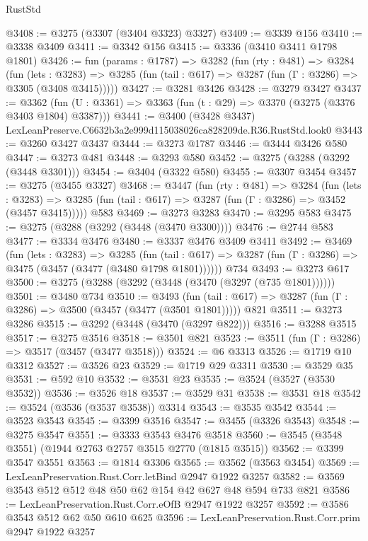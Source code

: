 \begin{lexlean}{RustStd}
\begin{coremodule}
@3408 := @3275 (@3307 (@3404 @3323) @3327)
@3409 := @3339 @156
@3410 := @3338 @3409
@3411 := @3342 @156
@3415 := @3336 (@3410 @3411 @1798 @1801)
@3426 := fun (params : @1787) =>
  @3282
    (fun (rty : @481) =>
    @3284
      (fun (lets : @3283) =>
      @3285 (fun (tail : @617) => @3287 (fun (Γ : @3286) => @3305 (@3408 @3415)))))
@3427 := @3281 @3426
@3428 := @3279 @3427
@3437 := @3362 (fun (U : @3361) => @3363 (fun (t : @29) => @3370 (@3275 (@3376 @3403 @1804) @3387)))
@3441 := @3400 (@3428 @3437) LexLeanPreserve.C6632b3a2e999d115038026ca828209de.R36.RustStd.look0
@3443 := @3260 @3427 @3437
@3444 := @3273 @1787
@3446 := @3444 @3426 @580
@3447 := @3273 @481
@3448 := @3293 @580
@3452 := @3275 (@3288 (@3292 (@3448 @3301)))
@3454 := @3404 (@3322 @580)
@3455 := @3307 @3454
@3457 := @3275 (@3455 @3327)
@3468 := @3447
    (fun (rty : @481) =>
    @3284
      (fun (lets : @3283) =>
      @3285 (fun (tail : @617) => @3287 (fun (Γ : @3286) => @3452 (@3457 @3415)))))
    @583
@3469 := @3273 @3283
@3470 := @3295 @583
@3475 := @3275 (@3288 (@3292 (@3448 (@3470 @3300))))
@3476 := @2744 @583
@3477 := @3334 @3476
@3480 := @3337 @3476 @3409 @3411
@3492 := @3469
    (fun (lets : @3283) =>
    @3285
      (fun (tail : @617) => @3287 (fun (Γ : @3286) => @3475 (@3457 (@3477 (@3480 @1798 @1801))))))
    @734
@3493 := @3273 @617
@3500 := @3275 (@3288 (@3292 (@3448 (@3470 (@3297 (@735 @1801))))))
@3501 := @3480 @734
@3510 := @3493
    (fun (tail : @617) => @3287 (fun (Γ : @3286) => @3500 (@3457 (@3477 (@3501 @1801)))))
    @821
@3511 := @3273 @3286
@3515 := @3292 (@3448 (@3470 (@3297 @822)))
@3516 := @3288 @3515
@3517 := @3275 @3516
@3518 := @3501 @821
@3523 := @3511 (fun (Γ : @3286) => @3517 (@3457 (@3477 @3518)))
@3524 := @6 @3313
@3526 := @1719 @10 @3312
@3527 := @3526 @23
@3529 := @1719 @29 @3311
@3530 := @3529 @35
@3531 := @592 @10
@3532 := @3531 @23
@3535 := @3524 (@3527 (@3530 @3532))
@3536 := @3526 @18
@3537 := @3529 @31
@3538 := @3531 @18
@3542 := @3524 (@3536 (@3537 @3538)) @3314
@3543 := @3535 @3542
@3544 := @3523 @3543
@3545 := @3399 @3516
@3547 := @3455 (@3326 @3543)
@3548 := @3275 @3547
@3551 := @3333 @3543 @3476 @3518
@3560 := @3545 (@3548 @3551) (@1944 @2763 @2757 @3515 @2770 (@1815 @3515))
@3562 := @3399 @3547 @3551
@3563 := @1814 @3306
@3565 := @3562 (@3563 @3454)
@3569 := LexLeanPreservation.Rust.Corr.letBind @2947 @1922 @3257
@3582 := @3569 @3543 @512 @512 @48 @50 @62 @154 @42 @627 @48 @594 @733 @821
@3586 := LexLeanPreservation.Rust.Corr.eOfB @2947 @1922 @3257
@3592 := @3586 @3543 @512 @62 @50 @610 @625
@3596 := LexLeanPreservation.Rust.Corr.prim @2947 @1922 @3257

\end{coremodule}
\end{lexlean}
